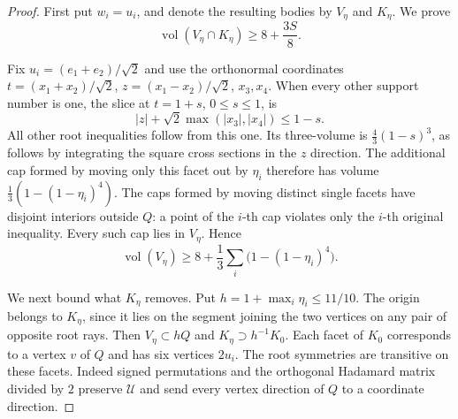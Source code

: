 \begin{proof}
First put $w_i=u_i$, and denote the resulting bodies by $V_\eta$
and $K_\eta$. We prove
\begin{equation}\label{round26:eq:pure-radial-bound}
 \operatorname{vol}(V_\eta\cap K_\eta)\ge8+\frac{3S}{8}.
\end{equation}

Fix $u_i=(e_1+e_2)/\sqrt2$ and use the orthonormal coordinates
$t=(x_1+x_2)/\sqrt2$, $z=(x_1-x_2)/\sqrt2$, $x_3,x_4$.
When every other support number is one, the slice at $t=1+s$,
$0\le s\le1$, is
\[
 |z|+\sqrt2\max(|x_3|,|x_4|)\le1-s.
\]
All other root inequalities follow from this one. Its three-volume
is $\frac43(1-s)^3$, as follows by integrating the square cross
sections in the $z$ direction. The additional cap formed by moving
only this facet out by $\eta_i$ therefore has volume
$\frac13(1-(1-\eta_i)^4)$. The caps formed by moving distinct
single facets have disjoint interiors outside $Q$: a point of the
$i$-th cap violates only the $i$-th original inequality. Every such
cap lies in $V_\eta$. Hence
\begin{equation}\label{round26:eq:radial-gain}
 \operatorname{vol}(V_\eta)
 \ge8+\frac13\sum_i\bigl(1-(1-\eta_i)^4\bigr).
\end{equation}

We next bound what $K_\eta$ removes. Put $h=1+\max_i\eta_i\le11/10$.
The origin belongs to $K_\eta$, since it lies on the segment joining the two vertices on any pair of opposite root rays.
Then $V_\eta\subset hQ$ and $K_\eta\supset h^{-1}K_0$.
Each facet of $K_0$ corresponds to a vertex $v$ of $Q$ and has
six vertices $2u_i$. The root symmetries are transitive on these
facets. Indeed signed permutations and the orthogonal Hadamard
matrix divided by $2$ preserve $\mathcal U$ and send every vertex
direction of $Q$ to a coordinate direction.


\end{proof}
